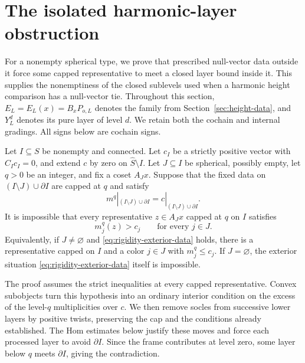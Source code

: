 \section{The isolated harmonic-layer obstruction}
\label{sec:rigidity}

For a nonempty spherical type, we prove that prescribed null-vector data
outside it force some capped representative to meet a closed layer bound
inside it.
This supplies the nonemptiness of the closed sublevels used when a harmonic
height comparison has a null-vector tie.  Throughout this section,
$E_L=E_L(x)=B_xP_{o,L}$ denotes the family from
Section~\ref{sec:height-data}, and $Y_L^d$ denotes its pure layer of level $d$.
We retain both the cochain and internal gradings.  All signs below are
cochain signs.

\begin{proposition}
\label{prop:isolated-layer}
Let $I\subseteq S$ be nonempty and connected.  Let $c_I$ be a strictly
positive vector with $C_Ic_I=0$, and extend $c$ by zero on
$\widehat S\setminus I$.  Let $J\subseteq I$ be spherical, possibly
empty, let $q>0$ be an integer, and fix a coset $A_Jx$.  Suppose that the
fixed data on $(I\setminus J)\cup\partial I$ are capped at $q$ and
satisfy
\begin{equation}
 m^q|_{(I\setminus J)\cup\partial I}
   =c|_{(I\setminus J)\cup\partial I}.
 \label{eq:rigidity-exterior-data}
\end{equation}
It is impossible that every representative $z\in A_Jx$ capped at $q$ on
$I$ satisfies
\begin{equation}
 m_j^q(z)>c_j\qquad\text{for every }j\in J.
 \label{eq:rigidity-strict-hypothesis}
\end{equation}
Equivalently, if $J\ne\varnothing$ and
\eqref{eq:rigidity-exterior-data} holds, there is a representative capped
on $I$ and a color $j\in J$ with $m_j^q\le c_j$.  If $J=\varnothing$,
the exterior situation \eqref{eq:rigidity-exterior-data} itself is
impossible.
\end{proposition}

The proof assumes the strict inequalities at every capped representative.
Convex subobjects turn this hypothesis into an ordinary interior condition
on the excess of the level-$q$ multiplicities over $c$.  We then remove
socles from successive lower layers by positive twists, preserving the cap
and the conditions already established.  The Hom estimates below justify
these moves and force each
processed layer to avoid $\partial I$.  Since the frame contributes at
level zero, some layer below $q$ meets $\partial I$, giving the
contradiction.


